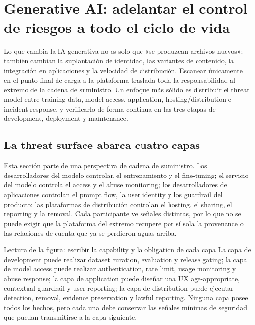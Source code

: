 \section{Generative AI: adelantar el control de riesgos a todo el ciclo de vida}

Lo que cambia la IA generativa no es solo que «se produzcan archivos nuevos»: también cambian la suplantación de identidad, las variantes de contenido, la integración en aplicaciones y la velocidad de distribución. Escanear únicamente en el punto final de carga a la plataforma traslada toda la responsabilidad al extremo de la cadena de suministro. Un enfoque más sólido es distribuir el threat model entre training data, model access, application, hosting/distribution e incident response, y verificarlo de forma continua en las tres etapas de development, deployment y maintenance.

\subsection{La threat surface abarca cuatro capas}

Esta sección parte de una perspectiva de cadena de suministro. Los desarrolladores del modelo controlan el entrenamiento y el fine-tuning; el servicio del modelo controla el access y el abuse monitoring; los desarrolladores de aplicaciones controlan el prompt flow, la user identity y los guardrail del producto; las plataformas de distribución controlan el hosting, el sharing, el reporting y la removal. Cada participante ve señales distintas, por lo que no se puede exigir que la plataforma del extremo recupere por sí sola la provenance o las relaciones de cuenta que ya se perdieron aguas arriba.


\begin{knowledgebox}{Lectura de la figura: escribir la capability y la obligation de cada capa}
La capa de development puede realizar dataset curation, evaluation y release gating; la capa de model access puede realizar authentication, rate limit, usage monitoring y abuse response; la capa de application puede diseñar una UX age-appropriate, contextual guardrail y user reporting; la capa de distribution puede ejecutar detection, removal, evidence preservation y lawful reporting. Ninguna capa posee todos los hechos, pero cada una debe conservar las señales mínimas de seguridad que puedan transmitirse a la capa siguiente.
\end{knowledgebox}

